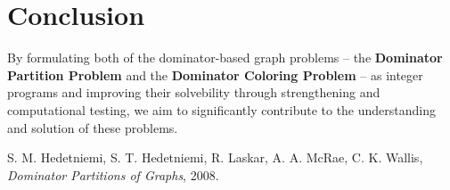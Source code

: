 \documentclass[12pt]{article}
\begin{document}
\section{Conclusion}

By formulating both of the dominator-based graph problems  -- the \textbf{Dominator Partition Problem} and the \textbf{Dominator Coloring Problem} -- as integer programs and improving their solvebility through strengthening and computational testing, we aim to significantly contribute to the understanding and solution of these problems.

\clearpage


\begin{thebibliography}{9}

S. M. Hedetniemi, S. T. Hedetniemi, R. Laskar, A. A. McRae, C. K. Wallis,
\textit{Dominator Partitions of Graphs}, 2008.

\end{thebibliography}
\end{document}
